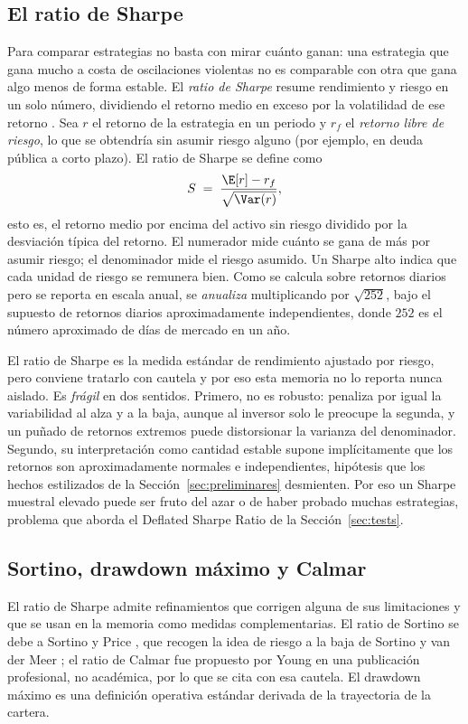 \subsection{El ratio de Sharpe}
\label{sec:economia-sharpe}

Para comparar estrategias no basta con mirar cuánto ganan: una estrategia que gana mucho a costa de oscilaciones violentas no es comparable con otra que gana algo menos de forma estable. El \emph{ratio de Sharpe} resume rendimiento y riesgo en un solo número, dividiendo el retorno medio en exceso por la volatilidad de ese retorno \cite{sharpe1994}. Sea $r$ el retorno de la estrategia en un periodo y $r_f$ el \emph{retorno libre de riesgo}, lo que se obtendría sin asumir riesgo alguno (por ejemplo, en deuda pública a corto plazo). El ratio de Sharpe se define como
\[
S \;=\; \frac{\E[r] - r_f}{\sqrt{\Var(r)}},
\]
esto es, el retorno medio por encima del activo sin riesgo dividido por la desviación típica del retorno. El numerador mide cuánto se gana de más por asumir riesgo; el denominador mide el riesgo asumido. Un Sharpe alto indica que cada unidad de riesgo se remunera bien. Como se calcula sobre retornos diarios pero se reporta en escala anual, se \emph{anualiza} multiplicando por $\sqrt{252}$, bajo el supuesto de retornos diarios aproximadamente independientes, donde $252$ es el número aproximado de días de mercado en un año.

El ratio de Sharpe es la medida estándar de rendimiento ajustado por riesgo, pero conviene tratarlo con cautela y por eso esta memoria no lo reporta nunca aislado. Es \emph{frágil} en dos sentidos. Primero, no es robusto: penaliza por igual la variabilidad al alza y a la baja, aunque al inversor solo le preocupe la segunda, y un puñado de retornos extremos puede distorsionar la varianza del denominador. Segundo, su interpretación como cantidad estable supone implícitamente que los retornos son aproximadamente normales e independientes, hipótesis que los hechos estilizados de la Sección~\ref{sec:preliminares} desmienten. Por eso un Sharpe muestral elevado puede ser fruto del azar o de haber probado muchas estrategias, problema que aborda el Deflated Sharpe Ratio de la Sección~\ref{sec:tests}.

\subsection{Sortino, drawdown máximo y Calmar}
\label{sec:economia-otros}

El ratio de Sharpe admite refinamientos que corrigen alguna de sus limitaciones y que se usan en la memoria como medidas complementarias. El ratio de Sortino se debe a Sortino y Price \cite{sortino1994}, que recogen la idea de riesgo a la baja de Sortino y van der Meer \cite{sortino1991}; el ratio de Calmar fue propuesto por Young \cite{young1991} en una publicación profesional, no académica, por lo que se cita con esa cautela. El drawdown máximo es una definición operativa estándar derivada de la trayectoria de la cartera.

